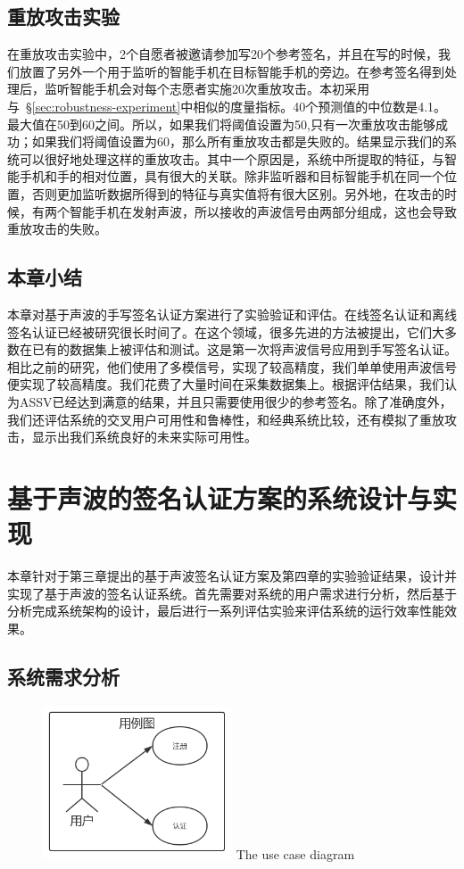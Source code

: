 \section{重放攻击实验}

在重放攻击实验中，2个自愿者被邀请参加写20个参考签名，并且在写的时候，我们放置了另外一个用于监听的智能手机在目标智能手机的旁边。在参考签名得到处理后，监听智能手机会对每个志愿者实施20次重放攻击。本初采用与~\S\ref{sec:robustness-experiment}中相似的度量指标。40个预测值的中位数是4.1。最大值在50到60之间。所以，如果我们将阈值设置为50,只有一次重放攻击能够成功；如果我们将阈值设置为60，那么所有重放攻击都是失败的。结果显示我们的系统可以很好地处理这样的重放攻击。其中一个原因是，系统中所提取的特征，与智能手机和手的相对位置，具有很大的关联。除非监听器和目标智能手机在同一个位置，否则更加监听数据所得到的特征与真实值将有很大区别。另外地，在攻击的时候，有两个智能手机在发射声波，所以接收的声波信号由两部分组成，这也会导致重放攻击的失败。

\section{本章小结}
本章对基于声波的手写签名认证方案进行了实验验证和评估。在线签名认证和离线签名认证已经被研究很长时间了。在这个领域，很多先进的方法被提出，它们大多数在已有的数据集上被评估和测试。这是第一次将声波信号应用到手写签名认证。相比之前的研究，他们使用了多模信号，实现了较高精度，我们单单使用声波信号便实现了较高精度。我们花费了大量时间在采集数据集上。根据评估结果，我们认为ASSV已经达到满意的结果，并且只需要使用很少的参考签名。除了准确度外，我们还评估系统的交叉用户可用性和鲁棒性，和经典系统比较，还有模拟了重放攻击，显示出我们系统良好的未来实际可用性。

\chapter{基于声波的签名认证方案的系统设计与实现}

本章针对于第三章提出的基于声波签名认证方案及第四章的实验验证结果，设计并实现了基于声波的签名认证系统。首先需要对系统的用户需求进行分析，然后基于分析完成系统架构的设计，最后进行一系列评估实验来评估系统的运行效率性能效果。

\section{系统需求分析}

\begin{figure}
  \centering
  \includegraphics[width=0.5\textwidth]{figure/use-case.png}
      {The use case diagram}
  \label{fig:use-case}
\end{figure}

